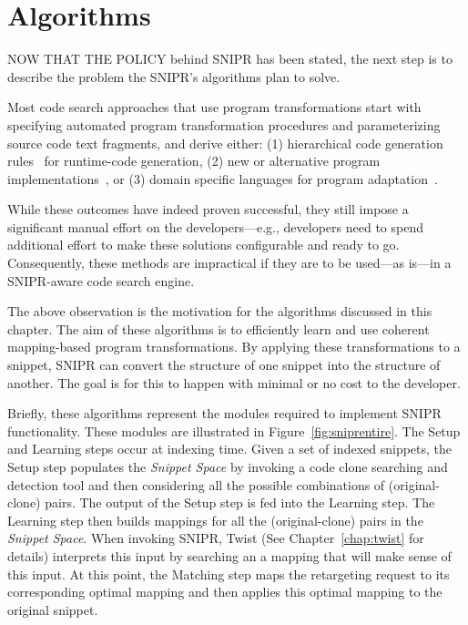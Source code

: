\chapter{Algorithms}{}
\label{chap:algorithms}

\lettrine[lraise=0.1, nindent=0em, slope=-.5em]{N}{OW THAT THE POLICY} behind \uppercase{SNIPR} has been stated, the next step is to describe the problem the SNIPR's algorithms plan to solve.
% 

Most code search approaches that use program transformations start with specifying automated program transformation procedures and parameterizing source code text fragments, and derive either: (1) hierarchical code generation rules~\cite{Nita:2010en} for runtime-code generation, (2) new or alternative program implementations~\cite{Wightman:2012gc}, or (3) domain specific languages for program adaptation~\cite{Visser:2001tc}.

While these outcomes have indeed proven successful, they still impose a significant manual effort on the developers---e.g., developers need to spend additional effort to make these solutions configurable and ready to go. Consequently, these methods are impractical if they are to be used---as is---in a \uppercase{SNIPR}-aware code search engine. 

The above observation is the motivation for the algorithms discussed in this chapter. The aim of these algorithms is to efficiently learn and use coherent mapping-based program transformations. By applying these transformations to a snippet, \uppercase{SnipR} can convert the structure of one snippet into the structure of another. The goal is for this to happen with minimal or no cost to the developer.

Briefly, these algorithms represent the modules required to implement \uppercase{SnipR} functionality. These modules are illustrated in Figure~\ref{fig:sniprentire}. The Setup and Learning steps occur at indexing time. Given a set of indexed snippets, the Setup step populates the \emph{Snippet Space} by invoking a code clone searching and detection tool and then considering all the possible combinations of (original-clone) pairs. The output of the Setup step is fed into the Learning step. The Learning step then builds mappings for all the (original-clone) pairs in the \emph{Snippet Space}. When invoking \uppercase{SnipR}, Twist (See Chapter~\ref{chap:twist} for details) interprets this input by searching an a mapping that will make sense of this input. At this point, the Matching step maps the retargeting request to its corresponding optimal mapping and then applies this optimal mapping to the original snippet.


